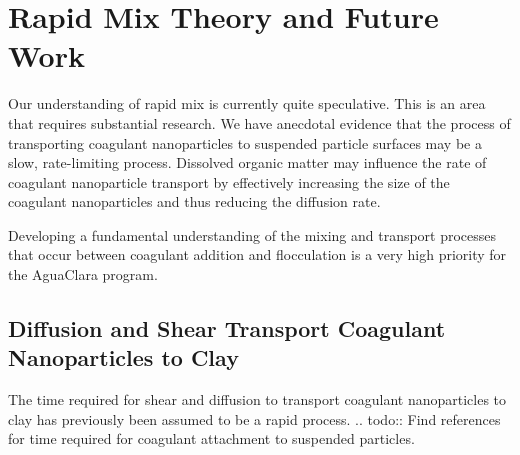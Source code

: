 \documentclass[letterpaper,10pt,english]{sphinxmanual}
\begin{document}
%
\begin{sphinxVerbatim}[commandchars=\\\{\}]
    
      
  
\end{sphinxVerbatim}


\chapter{Rapid Mix Theory and Future Work}
\label{\detokenize{Rapid_Mix/RM_Theory_and_Future_Work:rapid-mix-theory-and-future-work}}\label{\detokenize{Rapid_Mix/RM_Theory_and_Future_Work:title-rapid-mix-theory-and-future-work}}\label{\detokenize{Rapid_Mix/RM_Theory_and_Future_Work::doc}}
Our understanding of rapid mix is currently quite speculative. This is an area that requires substantial research. We have anecdotal evidence that the process of transporting coagulant nanoparticles to suspended particle surfaces may be a slow, rate-limiting process. Dissolved organic matter may influence the rate of coagulant nanoparticle transport by effectively increasing the size of the coagulant nanoparticles and thus reducing the diffusion rate.

Developing a fundamental understanding of the mixing and transport processes that occur between coagulant addition and flocculation is a very high priority for the AguaClara program.


\section{Diffusion and Shear Transport Coagulant Nanoparticles to Clay}
\label{\detokenize{Rapid_Mix/RM_Theory_and_Future_Work:diffusion-and-shear-transport-coagulant-nanoparticles-to-clay}}\label{\detokenize{Rapid_Mix/RM_Theory_and_Future_Work:heading-diffusion-and-shear-transport-coagulant-nanoparticles-to-clay}}
The time required for shear and diffusion to transport coagulant nanoparticles to clay has previously been assumed to be a rapid process.
.. todo:: Find references for time required for coagulant attachment to suspended particles.
\end{document}

